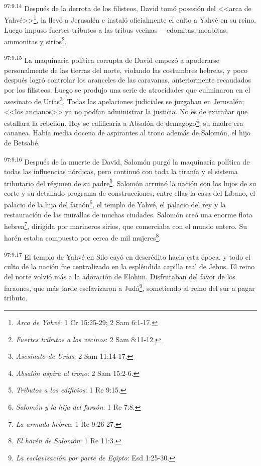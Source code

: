 \par
\textsuperscript{97:9.14} Después de la derrota de los filisteos, David tomó posesión del <<arca de Yahvé>>\footnote{\textit{Arca de Yahvé}: 1 Cr 15:25-29; 2 Sam 6:1-17.}, la llevó a Jerusalén e instaló oficialmente el culto a Yahvé en su reino. Luego impuso fuertes tributos a las tribus vecinas ---edomitas, moabitas, ammonitas y sirios\footnote{\textit{Fuertes tributos a los vecinos}: 2 Sam 8:11-12.}.

\par
\textsuperscript{97:9.15} La maquinaria política corrupta de David empezó a apoderarse personalmente de las tierras del norte, violando las costumbres hebreas, y poco después logró controlar los aranceles de las caravanas, anteriormente recaudados por los filisteos. Luego se produjo una serie de atrocidades que culminaron en el asesinato de Urías\footnote{\textit{Asesinato de Urías}: 2 Sam 11:14-17.}. Todas las apelaciones judiciales se juzgaban en Jerusalén; <<los ancianos>> ya no podían administrar la justicia. No es de extrañar que estallara la rebelión. Hoy se calificaría a Absalón de demagogo\footnote{\textit{Absalón aspira al trono}: 2 Sam 15:2-6.}; su madre era cananea. Había media docena de aspirantes al trono además de Salomón, el hijo de Betsabé.

\par
\textsuperscript{97:9.16} Después de la muerte de David, Salomón purgó la maquinaria política de todas las influencias nórdicas, pero continuó con toda la tiranía y el sistema tributario del régimen de su padre\footnote{\textit{Tributos a los edificios}: 1 Re 9:15.}. Salomón arruinó la nación con los lujos de su corte y su detallado programa de construcciones, entre ellas la casa del Líbano, el palacio de la hija del faraón\footnote{\textit{Salomón y la hija del faraón}: 1 Re 7:8.}, el templo de Yahvé, el palacio del rey y la restauración de las murallas de muchas ciudades. Salomón creó una enorme flota hebrea\footnote{\textit{La armada hebrea}: 1 Re 9:26-27.}, dirigida por marineros sirios, que comerciaba con el mundo entero. Su harén estaba compuesto por cerca de mil mujeres\footnote{\textit{El harén de Salomón}: 1 Re 11:3.}.

\par
\textsuperscript{97:9.17} El templo de Yahvé en Silo cayó en descrédito hacia esta época, y todo el culto de la nación fue centralizado en la espléndida capilla real de Jebus. El reino del norte volvió más a la adoración de Elohim. Disfrutaban del favor de los faraones, que más tarde esclavizaron a Judá\footnote{\textit{La esclavización por parte de Egipto}: Esd 1:25-30.}, sometiendo al reino del sur a pagar tributo.

